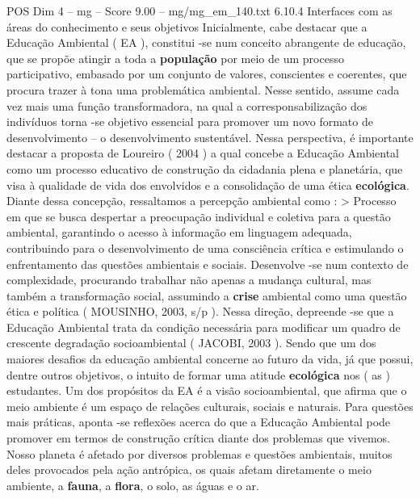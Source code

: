 \begin{textsample}{POS Dim 4 – mg – Score 9.00 – mg/mg\_em\_140.txt}  \label{ex:f4_pos_199}
6.10.4 Interfaces com as áreas do conhecimento e seus objetivos Inicialmente, cabe destacar que a Educação Ambiental ( EA ), constitui -se num conceito abrangente de educação, que se propõe atingir a toda a \textbf{população} por meio de um processo participativo, embasado por um conjunto de valores, conscientes e coerentes, que procura trazer à tona uma problemática ambiental.
Nesse sentido, assume cada vez mais uma função transformadora, na qual a corresponsabilização dos indivíduos torna -se objetivo essencial para promover um novo formato de desenvolvimento – o desenvolvimento sustentável.
Nessa perspectiva, é importante destacar a proposta de Loureiro ( 2004 ) a qual concebe a Educação Ambiental como um processo educativo de construção da cidadania plena e planetária, que visa à qualidade de vida dos envolvidos e a consolidação de uma ética \textbf{ecológica}.
Diante dessa concepção, ressaltamos a percepção ambiental como : > Processo em que se busca despertar a preocupação individual e coletiva para a questão ambiental, garantindo o acesso à informação em linguagem adequada, contribuindo para o desenvolvimento de uma consciência crítica e estimulando o enfrentamento das questões ambientais e sociais.
Desenvolve -se num contexto de complexidade, procurando trabalhar não apenas a mudança cultural, mas também a transformação social, assumindo a \textbf{crise} ambiental como uma questão ética e política ( MOUSINHO, 2003, s/p ).
Nessa direção, depreende -se que a Educação Ambiental trata da condição necessária para modificar um quadro de crescente degradação socioambiental ( JACOBI, 2003 ).
Sendo que um dos maiores desafios da educação ambiental concerne ao futuro da vida, já que possui, dentre outros objetivos, o intuito de formar uma atitude \textbf{ecológica} nos ( as ) estudantes.
Um dos propósitos da EA é a visão socioambiental, que afirma que o meio ambiente é um espaço de relações culturais, sociais e naturais.
Para questões mais práticas, aponta -se reflexões acerca do que a Educação Ambiental pode promover em termos de construção crítica diante dos problemas que vivemos.
Nosso planeta é afetado por diversos problemas e questões ambientais, muitos deles provocados pela ação antrópica, os quais afetam diretamente o meio ambiente, a \textbf{fauna}, a \textbf{flora}, o solo, as águas e o ar.

\end{textsample}
